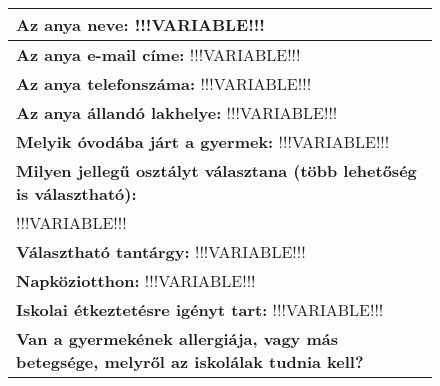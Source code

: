 \documentclass[10pt,a4paper]{article}
\begin{document}
\begin{figure}[!ht]
\begin{tabular}{|m{\textwidth}|}
\hline \vspace{3pt}
\textbf{Az anya neve:} \hspace{0.5cm} !!!VARIABLE!!! \vspace{3pt} \\ 
\hline \vspace{3pt}
\textbf{Az anya e-mail címe:} \hspace{0.5cm} !!!VARIABLE!!! \vspace{3pt} \\ 
\hline \vspace{3pt}
\textbf{Az anya telefonszáma:} \hspace{0.5cm} !!!VARIABLE!!! \vspace{3pt} \\ 
\hline \vspace{3pt}
\textbf{Az anya állandó lakhelye:} \hspace{0.5cm} !!!VARIABLE!!! \vspace{3pt} \\ 
\hline \vspace{3pt}
\textbf{Melyik óvodába járt a gyermek:} \hspace{0.5cm} !!!VARIABLE!!! \vspace{3pt} \\ 
\hline \vspace{3pt}
\textbf{Milyen jellegű osztályt választana (több lehetőség is választható):} \vspace{3pt} \\
\hspace{0.5cm} !!!VARIABLE!!! \vspace{3pt} \\ 
\hline \vspace{3pt}
\textbf{Választható tantárgy:} \hspace{0.5cm} !!!VARIABLE!!!   \vspace{3pt} \\ 
\hline \vspace{3pt}
\textbf{Napköziotthon:} \hspace{0.5cm} !!!VARIABLE!!!  \vspace{3pt} \\ 
\hline \vspace{3pt}
\textbf{Iskolai étkeztetésre igényt tart:} \hspace{0.5cm} !!!VARIABLE!!!  \vspace{3pt} \\ 
\hline \vspace{3pt}
\textbf{Van a gyermekének allergiája, vagy más betegsége, melyről az iskolálak tudnia kell?} \vspace{3pt} \\ 

\end{tabular}
\end{figure}
\end{document}
